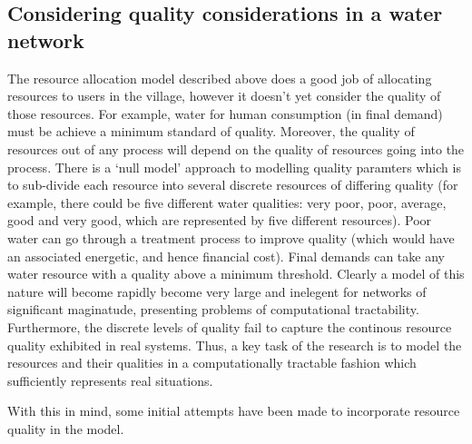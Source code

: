 \subsection{Considering quality considerations in a water network}
The resource allocation model described above does a good job of allocating resources to users in the village, however it doesn't yet consider the quality of those resources. For example, water for human consumption (in final demand) must be achieve a minimum standard of quality. Moreover, the quality of resources out of any process will depend on the quality of resources going into the process. There is a `null model' approach to modelling quality paramters which is to sub-divide each resource into several discrete resources of differing quality (for example, there could be five different water qualities: very poor, poor, average, good and very good, which are represented by five different resources). Poor water can go through a treatment process to improve quality (which would have an associated energetic, and hence financial cost). Final demands can take any water resource with a quality above a minimum threshold. Clearly a model of this nature will become rapidly become very large and inelegent for networks of significant maginatude, presenting problems of computational tractability. Furthermore, the discrete levels of quality fail to capture the continous resource quality exhibited in real systems.  Thus, a key task of the research is to model the resources and their qualities in a computationally tractable fashion which sufficiently represents real situations.

With this in mind, some initial attempts have been made to incorporate resource quality in the model.
